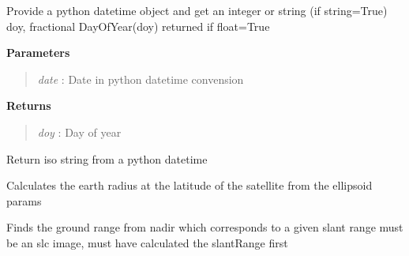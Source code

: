 \documentclass[letterpaper,10pt,openany,oneside]{sphinxmanual}
\begin{document}
\begin{fulllineitems}
\label{code:Metadata.date2doy}
Provide a python datetime object and get an integer or string (if string=True) doy, fractional DayOfYear(doy) returned if float=True

\textbf{Parameters}
\begin{quote}

\emph{date} : Date in python datetime convension
\end{quote}

\textbf{Returns}
\begin{quote}

\emph{doy}  : Day of year
\end{quote}

\end{fulllineitems}


\begin{fulllineitems}
\label{code:Metadata.datetime2iso}
Return iso string from a python datetime

\end{fulllineitems}


\begin{fulllineitems}
\label{code:Metadata.getEarthRadius}
Calculates the earth radius at the latitude of the satellite from the ellipsoid params

\end{fulllineitems}


\begin{fulllineitems}
\label{code:Metadata.getGroundRange}
Finds the ground range from nadir which corresponds to a given slant range
must be an slc image, must have calculated the slantRange first

\end{fulllineitems}

\end{document}
